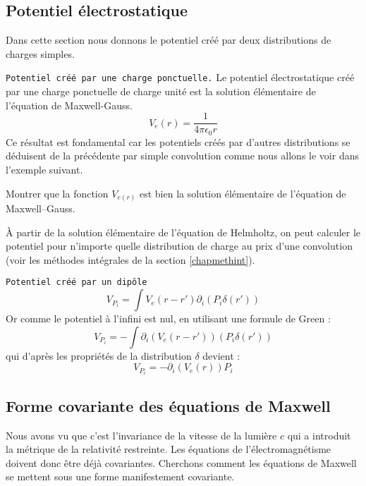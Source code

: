 \documentclass[12pt]{book}
\begin{document}
\subsection{Potentiel \'electrostatique}\label{secpotelec}
Dans cette section nous donnons le potentiel cr\'e\'e par deux
distributions de charges simples.
\begin{exmp}
{\tt Potentiel cr\'e\'e par une charge ponctuelle.} Le potentiel
\'electrostatique cr\'e\'e par une charge ponctuelle de charge unit\'e
est la solution \'el\'ementaire de l'\'equation de Maxwell-Gauss. 
\begin{equation}
V_e(r)=\frac{1}{4\pi\epsilon_0 r}
\end{equation}
Ce r\'esultat est fondamental car les potentiels cr\'e\'es par d'autres
distributions se d\'eduisent de la pr\'ec\'edente par simple
convolution comme nous allons le voir dans l'exemple suivant.
\end{exmp}
\begin{exo}
Montrer\cite{ma:distr:Petit91} que la fonction $V_{e(r)}$ est bien la solution
\'el\'ementaire de l'\'equation de Maxwell--Gauss.
\end{exo}
\`A partir de la solution \'el\'ementaire de l'\'equation de
Helmholtz, on peut calculer le potentiel pour n'importe quelle
distribution de charge au prix d'une convolution (voir les m\'ethodes
int\'egrales de la section \ref{chapmethint}).
\begin{exmp}
{\tt Potentiel cr\'e\'e par un dip\^ole }
\begin{equation}
V_{P_i}=\int V_e(r-r')\partial_i(P_i\delta(r'))
\end{equation}
Or comme  le potentiel \`a l'infini est nul, en utilisant une
formule de Green : 
\begin{equation}
V_{P_i}=-\int \partial_i(V_e(r-r'))(P_i\delta(r'))
\end{equation}
qui d'apr\`es les propri\'et\'es de la distribution $\delta$ devient :
\begin{equation}\label{eqpotdipo}
V_{P_i}=-\partial_i(V_e(r))P_i
\end{equation}
\end{exmp}

\subsection{Forme covariante des \'equations de Maxwell}\label{seceqmaxcov}
Nous avons vu que c'est l'invariance de la vitesse de la lumi\`ere $c$
qui a introduit la m\'etrique de la relativit\'e restreinte. Les
\'equations de l'\'electromagn\'etisme doivent donc \^etre d\'ej\`a
covariantes. Cherchons comment les \'equations de Maxwell se mettent
sous une forme manifestement covariante.
\end{document}
